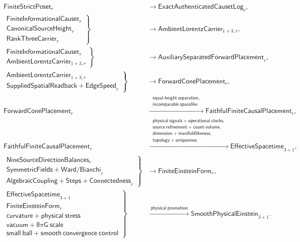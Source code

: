 \[
\begin{aligned}
\mathsf{FiniteStrictPoset}_r
&\longrightarrow \mathsf{ExactAuthenticatedCausetLog}_r,\\
\left.
\begin{gathered}
\mathsf{FiniteInformationalCauset}_r\\
\mathsf{CanonicalSourceHeight}_r\\
\mathsf{RankThreeCarrier}_r
\end{gathered}
\right\}
&\longrightarrow \mathsf{AmbientLorentzCarrier}_{1+3,r},\\
\left.
\begin{gathered}
\mathsf{FiniteInformationalCauset}_r\\
\mathsf{AmbientLorentzCarrier}_{1+3,r}
\end{gathered}
\right\}
&\longrightarrow \mathsf{AuxiliarySeparatedForwardPlacement}_r,\\
\left.
\begin{gathered}
\mathsf{AmbientLorentzCarrier}_{1+3,r}\\
\mathsf{SuppliedSpatialReadback+EdgeSpeed}_r
\end{gathered}
\right\}
&\longrightarrow \mathsf{ForwardConePlacement}_r,\\
\mathsf{ForwardConePlacement}_r
&\xrightarrow{\;\substack{\mathsf{equal\mbox{-}height\ separation,}\\
\mathsf{incomparable\ spacelike}}\;}
\mathsf{FaithfulFiniteCausalPlacement}_r,\\
\mathsf{FaithfulFiniteCausalPlacement}_r
&\xrightarrow{\;\substack{\mathsf{physical\ signals+operational\ clocks,}\\
\mathsf{source\ refinement+count\text{-}volume,}\\
\mathsf{dimension+manifoldlikeness,}\\
\mathsf{topology+uniqueness}}\;}
\mathsf{EffectiveSpacetime}_{3+1},\\[2pt]
\left.
\begin{gathered}
\mathsf{NineSourceDirectionBalances}_r\\
\mathsf{SymmetricFields+Ward/Bianchi}_r\\
\mathsf{AlgebraicCoupling+Steps+Connectedness}_r
\end{gathered}
\right\}
&\longrightarrow \mathsf{FiniteEinsteinForm}_r,\\[2pt]
\left.
\begin{gathered}
\mathsf{EffectiveSpacetime}_{3+1}\\
\mathsf{FiniteEinsteinForm}_r\\
\mathsf{curvature+physical\ stress}\\
\mathsf{vacuum+8\pi G\ scale}\\
\mathsf{small\ ball+smooth\ convergence\ control}
\end{gathered}
\right\}
&\xrightarrow{\;\mathsf{physical\ promotion}\;}
\mathsf{SmoothPhysicalEinstein}_{3+1} .
\end{aligned}
\]
